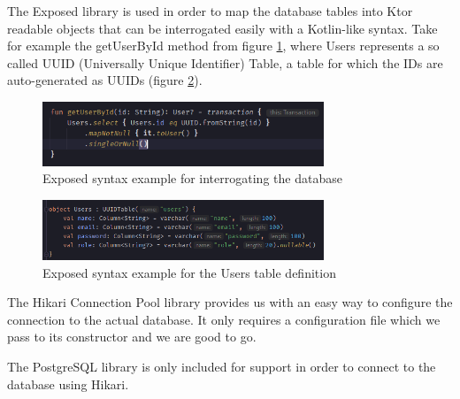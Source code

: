 The Exposed library is used in order to map the database tables into Ktor readable objects that can be interrogated easily with a Kotlin-like syntax. Take for example the getUserById method from figure \ref{fig:getUserById}, where Users represents a so called UUID (Universally Unique Identifier) Table, a table for which the IDs are auto-generated as UUIDs (figure \ref{fig:users-table}).

\begin{figure}
\centering
\includegraphics[width=0.75\textwidth]{figures/get_user_by_id.png}
\caption{Exposed syntax example for interrogating the database}
\label{fig:getUserById}
\end{figure}

\begin{figure}
\centering
\includegraphics[width=0.75\textwidth]{figures/users_table_example.png}
\caption{Exposed syntax example for the Users table definition}
\label{fig:users-table}
\end{figure}

The Hikari Connection Pool library provides us with an easy way to configure the connection to the actual database. It only requires a configuration file which we pass to its constructor and we are good to go.

The PostgreSQL library is only included for support in order to connect to the database using Hikari.